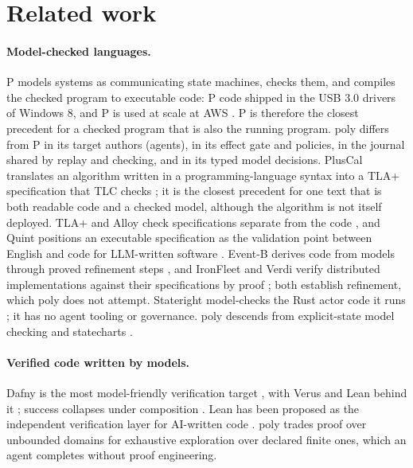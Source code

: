 \documentclass[11pt]{article}
\newcommand{\poly}{\textsf{poly}}
\begin{document}
\section{Related work}
\label{sec:related}

\paragraph{Model-checked languages.} P models systems as communicating state machines, checks them, and compiles the checked program to executable code: P code shipped in the USB 3.0 drivers of Windows 8, and P is used at scale at AWS \cite{desai2013p}. P is therefore the closest precedent for a checked program that is also the running program. \poly{} differs from P in its target authors (agents), in its effect gate and policies, in the journal shared by replay and checking, and in its typed model decisions. PlusCal translates an algorithm written in a programming-language syntax into a TLA+ specification that TLC checks \cite{lamport2009pluscal}; it is the closest precedent for one text that is both readable code and a checked model, although the algorithm is not itself deployed. TLA+ and Alloy check specifications separate from the code \cite{lamport2002tla,jackson2012alloy}, and Quint positions an executable specification as the validation point between English and code for LLM-written software \cite{quint2025llm}. Event-B derives code from models through proved refinement steps \cite{abrial2010eventb}, and IronFleet and Verdi verify distributed implementations against their specifications by proof \cite{hawblitzel2015ironfleet,wilcox2015verdi}; both establish refinement, which \poly{} does not attempt. Stateright model-checks the Rust actor code it runs \cite{stateright}; it has no agent tooling or governance. \poly{} descends from explicit-state model checking \cite{clarke1981synthesis,holzmann1997spin} and statecharts \cite{harel1987statecharts}.

\paragraph{Verified code written by models.} Dafny is the most model-friendly verification target \cite{loughridge2025dafnybench,bursuc2026vericoding}, with Verus and Lean behind it \cite{yang2025autoverus,ye2025verina}; success collapses under composition \cite{dafnycomp2026}. Lean has been proposed as the independent verification layer for AI-written code \cite{demoura2026lean}. \poly{} trades proof over unbounded domains for exhaustive exploration over declared finite ones, which an agent completes without proof engineering.
\end{document}
